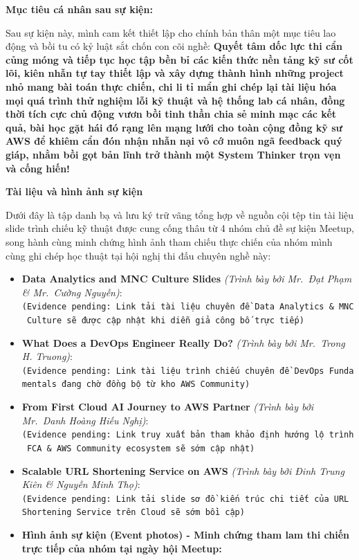 \vspace{0.5em}\noindent\textbf{Mục tiêu cá nhân sau sự
kiện:}\par

Sau sự kiện này, mình cam kết thiết lập cho chính bản thân một mục tiêu
lao động và bồi tu có kỷ luật sắt chốn con cõi nghề: \textbf{Quyết tâm
dốc lực thi cẩn củng móng và tiếp tục học tập bền bỉ các kiến thức nền
tảng kỹ sư cốt lõi, kiên nhẫn tự tay thiết lập và xây dựng thành hình
những project nhỏ mang bài toán thực chiến, chi li tỉ mẩn ghi chép lại
tài liệu hóa mọi quá trình thử nghiệm lỗi kỹ thuật và hệ thống lab cá
nhân, đồng thời tích cực chủ động vươn bồi tinh thần chia sẻ minh mạc
các kết quả, bài học gặt hái đó rạng lên mạng lưới cho toàn cộng đồng kỹ
sư AWS để khiêm cẩn đón nhận nhẫn nại vô cớ muôn ngã feedback quý giáp,
nhằm bồi gọt bản lĩnh trở thành một System Thinker trọn vẹn và cống
hiến!}

\vspace{0.5em}\noindent\textbf{Tài liệu và hình ảnh sự
kiện}\par

Dưới đây là tập danh bạ và lưu ký trữ vãng tổng hợp về nguồn cội tệp tin
tài liệu slide trình chiếu kỹ thuật được cung cống thâu từ 4 nhóm chủ đề
sự kiện Meetup, song hành cùng minh chứng hình ảnh tham chiếu thực chiến
của nhóm mình cùng ghi chép học thuật tại hội nghị thi đấu chuyên nghề
này:

\begin{itemize}
\tightlist
\item
  \textbf{Data Analytics and MNC Culture Slides} \emph{(Trình bày bởi
  Mr.~Đạt Phạm \& Mr.~Cường Nguyễn)}:
  \texttt{(Evidence\ pending:\ Link\ tải\ tài\ liệu\ chuyên\ đề\ Data\ Analytics\ \&\ MNC\ Culture\ sẽ\ được\ cập\ nhật\ khi\ diễn\ giả\ công\ bố\ trực\ tiếp)}
\item
  \textbf{What Does a DevOps Engineer Really Do?} \emph{(Trình bày bởi
  Mr.~Trong H. Truong)}:
  \texttt{(Evidence\ pending:\ Link\ tài\ liệu\ trình\ chiếu\ chuyên\ đề\ DevOps\ Fundamentals\ đang\ chờ\ đồng\ bộ\ từ\ kho\ AWS\ Community)}
\item
  \textbf{From First Cloud AI Journey to AWS Partner} \emph{(Trình bày
  bởi Mr.~Danh Hoàng Hiếu Nghị)}:
  \texttt{(Evidence\ pending:\ Link\ truy\ xuất\ bản\ tham\ khảo\ định\ hướng\ lộ\ trình\ FCA\ \&\ AWS\ Community\ ecosystem\ sẽ\ sớm\ cập\ nhật)}
\item
  \textbf{Scalable URL Shortening Service on AWS} \emph{(Trình bày bởi
  Đinh Trung Kiên \& Nguyễn Minh Thọ)}:
  \texttt{(Evidence\ pending:\ Link\ tải\ slide\ sơ\ đồ\ kiến\ trúc\ chi\ tiết\ của\ URL\ Shortening\ Service\ trên\ Cloud\ sẽ\ sớm\ bồi\ cập)}
\item
  \textbf{Hình ảnh sự kiện (Event photos) - Minh chứng tham lam thi
  chiến trực tiếp của nhóm tại ngày hội Meetup:}
\end{itemize}

